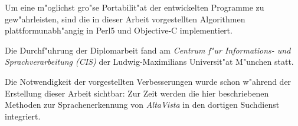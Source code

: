 Um eine m"oglichst gro"se Portabilit"at der entwickelten Programme zu gew"ahrleisten, sind die in dieser Arbeit vorgestellten Algorithmen plattformunabh"angig in Perl5 und Objective-C implementiert.

Die Durchf"uhrung der Diplomarbeit fand am {\em Centrum f"ur Informations- und Sprachverarbeitung (CIS)} der Ludwig-Maximilians Universit"at M"unchen statt. 

Die Notwendigkeit der vorgestellten Verbesserungen wurde schon w"ahrend der Erstellung dieser Arbeit sichtbar: Zur Zeit werden die hier beschriebenen Methoden zur Sprachenerkennung von {\em AltaVista} in den dortigen Suchdienst integriert.


